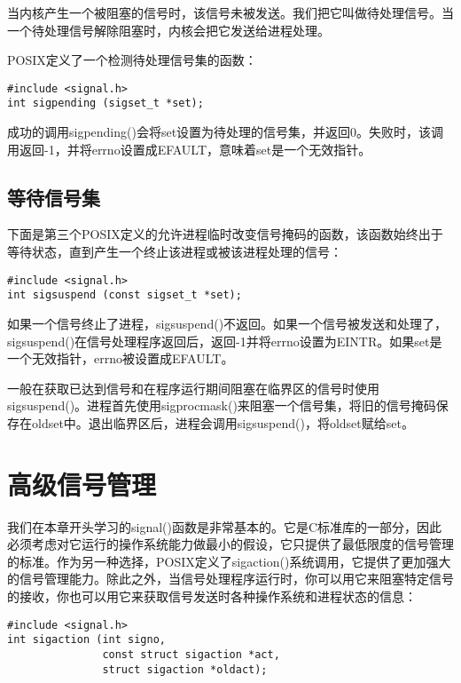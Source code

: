 当内核产生一个被阻塞的信号时，该信号未被发送。我们把它叫做待处理信号。当一个待处理信号解除阻塞时，内核会把它发送给进程处理。

POSIX定义了一个检测待处理信号集的函数：

\begin{lstlisting}
#include <signal.h>
int sigpending (sigset_t *set);
\end{lstlisting}

成功的调用sigpending()会将set设置为待处理的信号集，并返回0。失败时，该调用返回-1，并将errno设置成EFAULT，意味着set是一个无效指针。

\subsection{等待信号集}

下面是第三个POSIX定义的允许进程临时改变信号掩码的函数，该函数始终出于等待状态，直到产生一个终止该进程或被该进程处理的信号：

\begin{lstlisting}
#include <signal.h>
int sigsuspend (const sigset_t *set);
\end{lstlisting}

如果一个信号终止了进程，sigsuspend()不返回。如果一个信号被发送和处理了，sigsuspend()在信号处理程序返回后，返回-1并将errno设置为EINTR。如果set是一个无效指针，errno被设置成EFAULT。

一般在获取已达到信号和在程序运行期间阻塞在临界区的信号时使用sigsuspend()。进程首先使用sigprocmask()来阻塞一个信号集，将旧的信号掩码保存在oldset中。退出临界区后，进程会调用sigsuspend()，将oldset赋给set。

\section{高级信号管理}

我们在本章开头学习的signal()函数是非常基本的。它是C标准库的一部分，因此必须考虑对它运行的操作系统能力做最小的假设，它只提供了最低限度的信号管理的标准。作为另一种选择，POSIX定义了sigaction()系统调用，它提供了更加强大的信号管理能力。除此之外，当信号处理程序运行时，你可以用它来阻塞特定信号的接收，你也可以用它来获取信号发送时各种操作系统和进程状态的信息：

\begin{lstlisting}
#include <signal.h>
int sigaction (int signo,
               const struct sigaction *act,
               struct sigaction *oldact);
\end{lstlisting}

